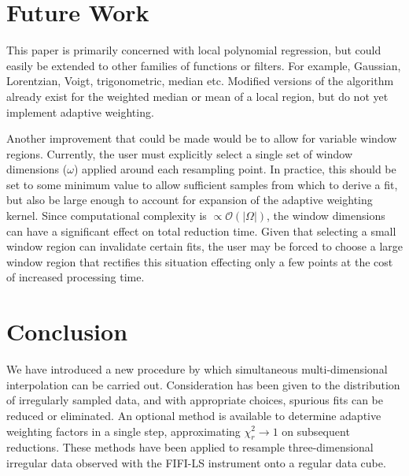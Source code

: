 \section{Future Work}\label{sec:future-work}

This paper is primarily concerned with local polynomial regression, but could
easily be extended to other families of functions or filters.
For example, Gaussian, Lorentzian, Voigt, trigonometric, median etc.
Modified versions of the algorithm already exist for the weighted median
or mean of a local region, but do not yet implement adaptive weighting.

Another improvement that could be made would be to allow for variable window
regions.
Currently, the user must explicitly select a single set of window dimensions
($\omega$) applied around each resampling point.
In practice, this should be set to some minimum value to allow sufficient
samples from which to derive a fit, but also be large enough to account for
expansion of the adaptive weighting kernel.
Since computational complexity is $\propto \mathcal{O}(|\Omega|)$, the window
dimensions can have a significant effect on total reduction time.
Given that selecting a small window region can invalidate certain fits, the
user may be forced to choose a large window region that rectifies this
situation effecting only a few points at the cost of increased processing time.

\section{Conclusion}\label{sec:conclusion}
We have introduced a new procedure by which simultaneous multi-dimensional
interpolation can be carried out.
Consideration has been given to the distribution of irregularly sampled data,
and with appropriate choices, spurious fits can be reduced or eliminated.
An optional method is available to determine adaptive weighting factors in a
single step, approximating $\chi_r^2 \to 1$ on subsequent reductions.
These methods have been applied to resample three-dimensional irregular data
observed with the FIFI-LS instrument onto a regular data cube.
